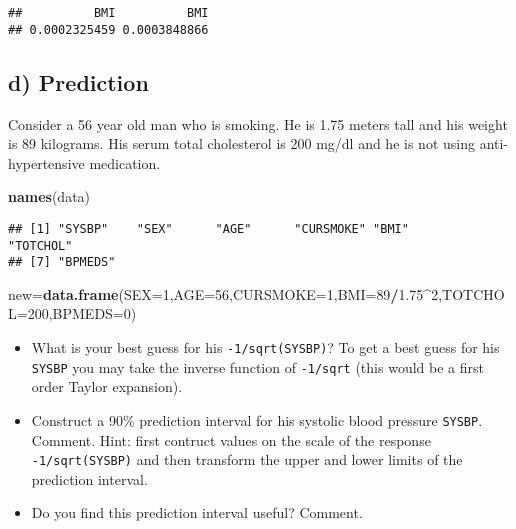 \documentclass[]{article}
\newenvironment{Shaded}{\begin{snugshade}}{\end{snugshade}}
\newcommand{\KeywordTok}[1]{\textcolor[rgb]{0.13,0.29,0.53}{\textbf{#1}}}
\newcommand{\DataTypeTok}[1]{\textcolor[rgb]{0.13,0.29,0.53}{#1}}
\newcommand{\DecValTok}[1]{\textcolor[rgb]{0.00,0.00,0.81}{#1}}
\newcommand{\FloatTok}[1]{\textcolor[rgb]{0.00,0.00,0.81}{#1}}
\newcommand{\OperatorTok}[1]{\textcolor[rgb]{0.81,0.36,0.00}{\textbf{#1}}}
\newcommand{\NormalTok}[1]{#1}
\providecommand{\tightlist}{%
  \setlength{\itemsep}{0pt}\setlength{\parskip}{0pt}}
\begin{document}
\begin{verbatim}
##          BMI          BMI 
## 0.0002325459 0.0003848866
\end{verbatim}

\subsection{d) Prediction}\label{d-prediction}

Consider a 56 year old man who is smoking. He is 1.75 meters tall and
his weight is 89 kilograms. His serum total cholesterol is 200 mg/dl and
he is not using anti-hypertensive medication.

\begin{Shaded}
\begin{Highlighting}[]
\KeywordTok{names}\NormalTok{(data)}
\end{Highlighting}
\end{Shaded}

\begin{verbatim}
## [1] "SYSBP"    "SEX"      "AGE"      "CURSMOKE" "BMI"      "TOTCHOL" 
## [7] "BPMEDS"
\end{verbatim}

\begin{Shaded}
\begin{Highlighting}[]
\NormalTok{new=}\KeywordTok{data.frame}\NormalTok{(}\DataTypeTok{SEX=}\DecValTok{1}\NormalTok{,}\DataTypeTok{AGE=}\DecValTok{56}\NormalTok{,}\DataTypeTok{CURSMOKE=}\DecValTok{1}\NormalTok{,}\DataTypeTok{BMI=}\DecValTok{89}\OperatorTok{/}\FloatTok{1.75}\OperatorTok{^}\DecValTok{2}\NormalTok{,}\DataTypeTok{TOTCHOL=}\DecValTok{200}\NormalTok{,}\DataTypeTok{BPMEDS=}\DecValTok{0}\NormalTok{)}
\end{Highlighting}
\end{Shaded}

\begin{itemize}
\tightlist
\item
  What is your best guess for his \texttt{-1/sqrt(SYSBP)}? To get a best
  guess for his \texttt{SYSBP} you may take the inverse function of
  \texttt{-1/sqrt} (this would be a first order Taylor expansion).
\item
  Construct a 90\% prediction interval for his systolic blood pressure
  \texttt{SYSBP}. Comment. Hint: first contruct values on the scale of
  the response \texttt{-1/sqrt(SYSBP)} and then transform the upper and
  lower limits of the prediction interval.
\item
  Do you find this prediction interval useful? Comment.
\end{itemize}
\end{document}
